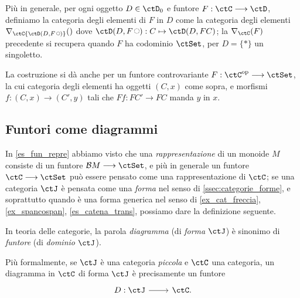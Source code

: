 Più in generale, per ogni oggetto \(D\in\ctD_0\) e funtore \(F : \ctC\fun\ctD\), definiamo la categoria degli elementi di \(F\) in \(D\) come la categoria degli elementi \(\Elts\ctC{\Hom\ctD(D,F\blank)}\) dove \(\Hom\ctD(D,F\blank) : C\mapsto\Hom\ctD(D,FC)\); la \(\Elts\ctC F\) precedente si recupera quando \(F\) ha codominio \(\ctSet\), per \(D=\{*\}\) un singoletto.

La costruzione si dà anche per un funtore controvariante \(F : \ctC^\op\fun\ctSet\), la cui categoria degli elementi ha oggetti \((C,x)\) come sopra, e morfismi \(f : (C,x)\to (C',y)\) tali che \(Ff : FC'\to FC\) manda \(y\) in \(x\).
\subsection{Funtori come diagrammi}
In \ref{es_fun_repre} abbiamo visto che una \emph{rappresentazione} di un monoide \(M\) consiste di un funtore \(\susp M \fun\ctSet\), e più in generale un funtore \(\ctC\fun\ctSet\) può essere pensato come una rappresentazione di \(\ctC\); se una categoria \(\ctJ\) è pensata come una \emph{forma} nel senso di \ref{ssec:categorie_forme}, e soprattutto quando è una forma generica nel senso di \ref{ex_cat_freccia}, \ref{ex_spancospan}, \ref{es_catena_trans}, possiamo dare la definizione seguente.
\begin{definition}\label{def_diagramma_comm}
	In teoria delle categorie, la parola \emph{diagramma} (di \emph{forma} \(\ctJ\)) è sinonimo di \emph{funtore} (di \emph{dominio} \(\ctJ\)).

	Più formalmente, se \(\ctJ\) è una categoria \emph{piccola} e \(\ctC\) una categoria, un diagramma in \(\ctC\) di forma \(\ctJ\) è precisamente un funtore
	\[\begin{tikzcd}
			D : \ctJ \ar[r] & \ctC.
		\end{tikzcd}
	\]
\end{definition}
